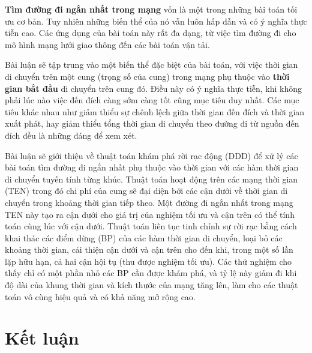 \documentclass[fontsize=14pt,DIV=15pt,twoside=false]{scrbook}
\newcommand{\toc}[0]{
\tableofcontents
\listoffigures
\listoftables
}
\begin{document}

\textbf{Tìm đường đi ngắn nhất trong mạng} vốn là một trong những bài toán tối ưu cơ bản. Tuy nhiên những biến thể  của nó vẫn luôn hấp dẫn và có ý nghĩa thực tiễn cao. Các ứng dụng của bài toán này rất đa dạng, từ việc tìm đường đi cho mô hình mạng lưới giao thông đến các bài toán vận tải. 

Bài luận sẽ tập trung vào một biến thể đặc biệt của bài toán, với việc thời gian di chuyển trên một cung (trọng số của cung) trong mạng phụ thuộc vào \textbf{thời gian bắt đầu} di chuyển trên cung đó. Điều này có ý nghĩa thực tiễn, khi không phải lúc nào việc đến đích càng sớm càng tốt cũng mục tiêu duy nhất. Các mục tiêu khác nhau như giảm thiểu sự chênh lệch giữa thời gian đến đích và thời gian xuất phát, hay giảm thiểu tổng thời gian di chuyển theo đường đi từ nguồn đến đích đều là những đáng để xem xét.
    
Bài luận sẽ giới thiệu về thuật toán khám phá rời rạc động (DDD) để xử lý các bài toán tìm đường đi ngắn nhất phụ thuộc vào thời gian với các hàm thời gian di chuyển tuyến tính từng khúc. Thuật toán hoạt động trên các mạng thời gian (TEN) trong đó chi phí của cung sẽ đại diện bởi các cận dưới về thời gian di chuyển trong khoảng thời gian tiếp theo. Một đường đi ngắn nhất trong mạng TEN này tạo ra cận dưới cho giá trị của nghiệm tối ưu và cận trên có thể tính toán cùng lúc với cận dưới. Thuật toán liên tục tinh chỉnh sự rời rạc bằng cách khai thác các điểm dừng (BP) của các hàm thời gian di chuyển, loại bỏ các khoảng thời gian, cải thiện cận dưới và cận trên cho đến khi, trong một số lần lặp hữu hạn, cả hai cận hội tụ (thu được nghiệm tối ưu). Các thử nghiệm cho thấy chỉ có một phần nhỏ các BP cần được khám phá, và tỷ lệ này giảm đi khi độ dài của khung thời gian và kích thước của mạng tăng lên, làm cho các thuật toán vô cùng hiệu quả và có khả năng mở rộng cao.


\toc

%
%
%
%
%

\chapter*{Kết luận}\label{kux1ebft-luux1eadn}


\printbibliography
%

\backmatter
\end{document}

